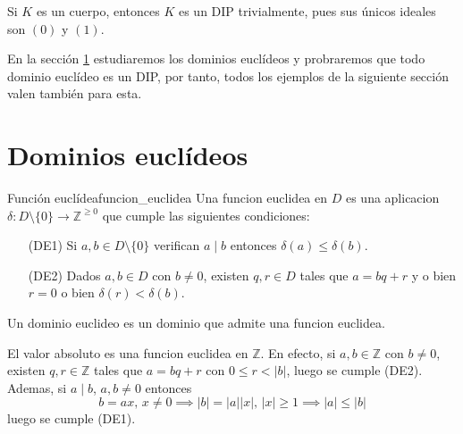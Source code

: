 \begin{example}{}{}
Si $K$ es un cuerpo, entonces $K$ es un DIP trivialmente, pues sus únicos ideales son $(0)$ y $(1)$.
\end{example}

En la sección \ref{dominios_euclideos} estudiaremos los dominios euclídeos y probraremos que todo dominio euclídeo es un DIP, por tanto, todos los ejemplos de la siguiente sección valen también para esta.

\clearpage
\section{Dominios euclídeos}\label{dominios_euclideos}

\begin{definition}{Función euclídea}{funcion_euclidea}
Una funcion euclidea en \(D\) es una aplicacion \(\delta: D \setminus \{0\} \to \mathbb{Z}^{\geq 0}\) que cumple las siguientes condiciones:

\begin{itemize}
\item[(DE1)] Si \(a, b \in D \setminus \{0\}\) verifican \(a \mid b\) entonces \(\delta(a) \leq \delta(b)\).

\item[(DE2)] Dados \(a, b \in D\) con \(b \neq 0\), existen \(q, r \in D\) tales que \(a = bq + r\) y o bien \(r = 0\) o bien \(\delta(r) < \delta(b)\).
\end{itemize}

Un dominio euclideo es un dominio que admite una funcion euclidea.
\end{definition}

\begin{example}{}{}
El valor absoluto es una funcion euclidea en \(\mathbb{Z}\). En efecto, si \(a, b \in \mathbb{Z}\) con \(b \neq 0\), existen \(q, r \in \mathbb{Z}\) tales que \(a = bq + r\) con \(0 \leq r < |b|\), luego se cumple (DE2). Ademas, si \(a \mid b\), \(a,b \neq 0\) entonces
\[
b = ax,\, x \neq 0 \implies |b| = |a||x|,\, |x| \geq 1 \implies |a| \leq |b|
\]
luego se cumple (DE1).
\end{example}

